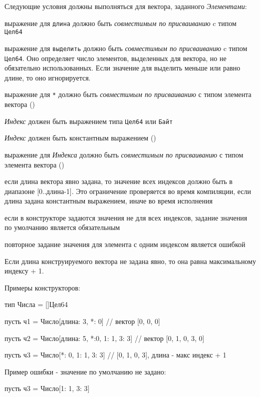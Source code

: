 \bigskip
Следующие условия должны выполняться для вектора, заданного \emph{Элементами}:
\begin{d_itemize}
\item
    выражение для \verb+длина+ должно быть \emph{совместимым по присваиванию} c типом \verb|Цел64|
\item
    выражение для \verb+выделить+ должно быть \emph{совместимым по присваиванию} c типом \verb|Цел64|. 
    Оно определяет число элементов, выделенных для вектора, но не обязательно использованных.
    Если значение для выделить меньше или равно длине, то оно игнорируется.
\item
    выражение для \verb+*+ должно быть \emph{совместимым по присваиванию} с типом элемента вектора () 
\item
    \emph{Индекс} должен быть выражением типа \verb|Цел64| или \verb|Байт|
\item
    \emph{Индекс} должен быть константным выражением ()
\item
    выражение для \emph{Индекса} должно быть \emph{совместимым по присваиванию} с типом элемента вектора ()
\item
    если длина вектора явно задана, то значение всех индексов должно быть в диапазоне [0..длина-1]. 
    Это ограничение проверяется во время компиляции, если длина задана константным выражением, иначе во время исполнения
\item
    если в конструкторе задаются значения не для всех индексов, задание значения по умолчанию является обязательным
\item
    повторное задание значения для элемента с одним индексом является ошибкой
\end{d_itemize}

Если длина конструируемого вектора не задана явно, то она равна максимальному индексу + 1.

\bigskip
Примеры конструкторов:
\begin{Trivil}[vspace=2pt]
тип Числа = []Цел64

пусть ч1 = Число[длина: 3, *: 0] 
// вектор [0, 0, 0]

пусть ч2 = Число[длина: 5, *:0, 1: 1, 3: 3] 
// вектор [0, 1, 0, 3, 0]

пусть ч3 = Число[*: 0, 1: 1, 3: 3]  
// [0, 1, 0, 3], длина - макс индекс + 1
\end{Trivil}

Пример ошибки - значение по умолчанию не задано:
\begin{SampleErr}[vspace=2pt]
пусть ч3 = Число[1: 1, 3: 3]  
\end{SampleErr}

